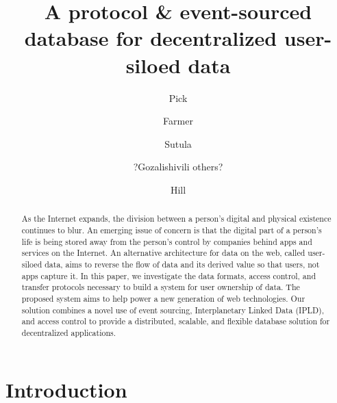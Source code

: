 \documentclass{textile}
\begin{document}
\pagecolor{white}

\title[Draft - Textile Threads]{A protocol \& event-sourced database for decentralized user-siloed data}
\author{Pick}
\author{Farmer}
\author{Sutula}
 
\author{?Gozalishivili others?}
 
\author{Hill}
 


\revised{\today}




\begin{abstract}
As the Internet expands, the division between a person's digital and physical existence continues to blur. An emerging issue of concern is that the digital part of a person's life is being stored away from the person's control by companies behind apps and services on the Internet. An alternative architecture for data on the web, called user-siloed data, aims to reverse the flow of data and its derived value so that users, not apps capture it. In this paper, we investigate the data formats, access control, and transfer protocols necessary to build a system for user ownership of data. The proposed system aims to help power a new generation of web technologies. Our solution combines a novel use of event sourcing, Interplanetary Linked Data (IPLD), and access control to provide a distributed, scalable, and flexible database solution for decentralized applications.
\end{abstract}

\maketitle

\section{Introduction}
\end{document}
